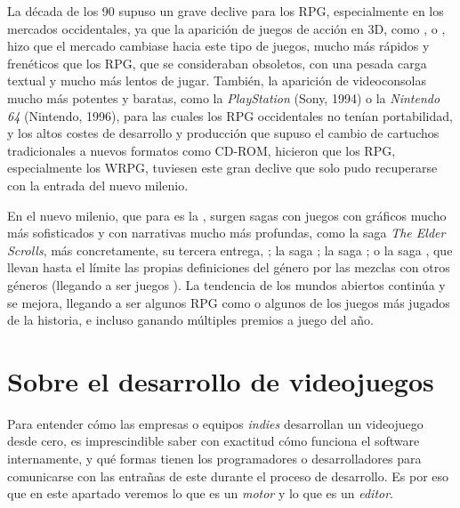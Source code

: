 La década de los 90 supuso un grave declive para los RPG, especialmente en los mercados occidentales, ya que la aparición de juegos de acción en 3D, como ,  o , hizo que el mercado cambiase hacia este tipo de juegos, mucho más rápidos y frenéticos que los RPG, que se consideraban obsoletos, con una pesada carga textual y mucho más lentos de jugar. También, la aparición de videoconsolas mucho más potentes y baratas, como la \textit{PlayStation} (Sony, 1994) o la \textit{Nintendo 64} (Nintendo, 1996), para las cuales los RPG occidentales no tenían portabilidad, y los altos costes de desarrollo y producción que supuso el cambio de cartuchos tradicionales a nuevos formatos como CD-ROM, hicieron que los RPG, especialmente los WRPG, tuviesen este gran declive que solo pudo recuperarse con la entrada del nuevo milenio.

\medskip

En el nuevo milenio, que para \citeauthor{barton2008dungeons} es la , surgen sagas con juegos con gráficos mucho más sofisticados y con narrativas mucho más profundas, como la saga \textit{The Elder Scrolls}, más concretamente, su tercera entrega, ; la saga ; la saga ; o la saga , que llevan hasta el límite las propias definiciones del género por las mezclas con otros géneros (llegando a ser juegos ). La tendencia de los mundos abiertos continúa y se mejora, llegando a ser algunos RPG como  o  algunos de los juegos más jugados de la historia, e incluso ganando múltiples premios a juego del año.

\section{Sobre el desarrollo de videojuegos}
Para entender cómo las empresas o equipos \textit{indies} desarrollan un videojuego desde cero, es imprescindible saber con exactitud cómo funciona el software internamente, y qué formas tienen los programadores o desarrolladores para comunicarse con las entrañas de este durante el proceso de desarrollo. Es por eso que en este apartado veremos lo que es un \textit{motor} y lo que es un \textit{editor}.

